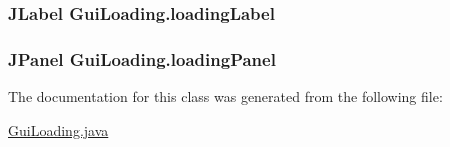 \subsubsection[{\texorpdfstring{loading\+Label}{loadingLabel}}]{\setlength{\rightskip}{0pt plus 5cm}J\+Label Gui\+Loading.\+loading\+Label\hspace{0.3cm}{\ttfamily [private]}}\hypertarget{classGuiLoading_a885e7ee695236c2a7a4428658828b827}{}\label{classGuiLoading_a885e7ee695236c2a7a4428658828b827}
\subsubsection[{\texorpdfstring{loading\+Panel}{loadingPanel}}]{\setlength{\rightskip}{0pt plus 5cm}J\+Panel Gui\+Loading.\+loading\+Panel\hspace{0.3cm}{\ttfamily [private]}}\hypertarget{classGuiLoading_ad7da2e974b1f70476fc92e8b3dc7e853}{}\label{classGuiLoading_ad7da2e974b1f70476fc92e8b3dc7e853}


The documentation for this class was generated from the following file\+:\begin{DoxyCompactItemize}
\item 
\hyperlink{GuiLoading_8java}{Gui\+Loading.\+java}\end{DoxyCompactItemize}
